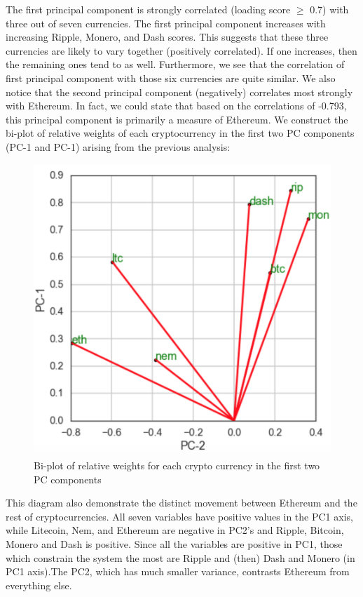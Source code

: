 \documentclass[12pt,twoside]{article}
\begin{document}
\bigbreak
The first principal component is strongly correlated (loading score $\geq$ 0.7) with three out of seven currencies. The first principal component increases with increasing Ripple, Monero, and Dash scores. This suggests that these three currencies are likely to vary together (positively correlated). If one increases, then the remaining ones tend to as well. Furthermore, we see that the correlation of first principal component with those six currencies are quite similar. \newline
We also notice that the second principal component (negatively) correlates most strongly with Ethereum. In fact, we could state that based on the correlations of -0.793, this principal component is primarily a measure of Ethereum.
\bigbreak
We construct the bi-plot of relative weights of each cryptocurrency in the first two PC components (PC-1 and PC-1) arising from the previous analysis:
\bigbreak
\begin{figure}[H]
\begin{center}
\includegraphics[scale=.7]{biplot1.png}
\caption{Bi-plot of relative weights for each crypto currency in the first two PC components}
\end{center}
\end{figure}
\bigbreak
This diagram also demonstrate the distinct movement between Ethereum and the rest of cryptocurrencies. All seven variables have positive values in the PC1 axis, while Litecoin, Nem, and Ethereum are negative in PC2's and Ripple, Bitcoin, Monero and Dash is positive. Since all the variables are positive in PC1, those which constrain the system the most are Ripple and (then) Dash and Monero (in PC1 axis).The PC2, which has much smaller variance, contrasts Ethereum from everything else.
\end{document}
